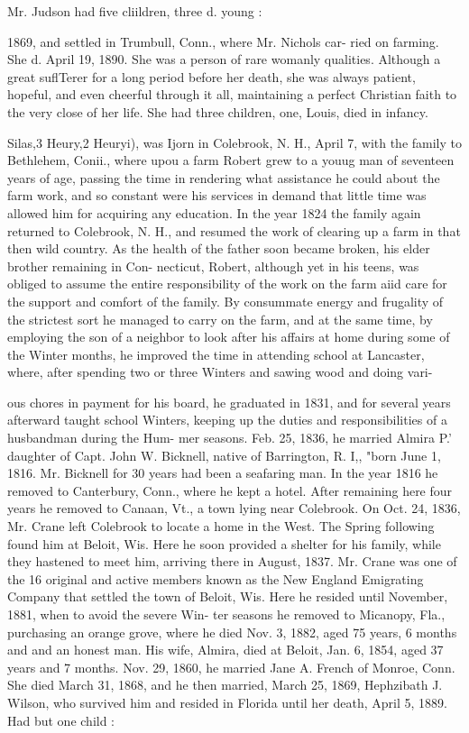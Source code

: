 \documentclass[oneside]{book}
\begin{document}
Mr. Judson had five cliildren, three d. young : 




1869, and settled in Trumbull, Conn., where Mr. Nichols car- 
ried on farming. She d. April 19, 1890. She was a person of 
rare womanly qualities. Although a great suflTerer for a long 
period before her death, she was always patient, hopeful, and 
even cheerful through it all, maintaining a perfect Christian 
faith to the very close of her life. She had three children, 
one, Louis, died in infancy. 



Silas,3 Heury,2 Heuryi), was Ijorn in Colebrook, N. H., April 7, 
with the family to Bethlehem, Conii., where upou a farm Robert 
grew to a youug man of seventeen years of age, passing the time 
in rendering what assistance he could about the farm work, and 
so constant were his services in demand that little time was allowed 
him for acquiring any education. In the year 1824 the family 
again returned to Colebrook, N. H., and resumed the work of 
clearing up a farm in that then wild country. As the health of the 
father soon became broken, his elder brother remaining in Con- 
necticut, Robert, although yet in his teens, was obliged to assume 
the entire responsibility of the work on the farm aiid care for the 
support and comfort of the family. By consummate energy and 
frugality of the strictest sort he managed to carry on the farm, 
and at the same time, by employing the son of a neighbor to look 
after his affairs at home during some of the Winter months, he 
improved the time in attending school at Lancaster, where, after 
spending two or three Winters and sawing wood and doing vari- 




ous chores in payment for his board, he graduated in 1831, and 
for several years afterward taught school Winters, keeping up 
the duties and responsibilities of a husbandman during the Hum- 
mer seasons. Feb. 25, 1836, he married Almira P.' daughter 
of Capt. John W. Bicknell, native of Barrington, R. I,, "born 
June 1, 1816. Mr. Bicknell for 30 years had been a seafaring 
man. In the year 1816 he removed to Canterbury, Conn., 
where he kept a hotel. After remaining here four years he 
removed to Canaan, Vt., a town lying near Colebrook. On 
Oct. 24, 1836, Mr. Crane left Colebrook to locate a home in the 
West. The Spring following found him at Beloit, Wis. Here 
he soon provided a shelter for his family, while they hastened to 
meet him, arriving there in August, 1837. Mr. Crane was one 
of the 16 original and active members known as the New England 
Emigrating Company that settled the town of Beloit, Wis. Here 
he resided until November, 1881, when to avoid the severe Win- 
ter seasons he removed to Micanopy, Fla., purchasing an orange 
grove, where he died Nov. 3, 1882, aged 75 years, 6 months and 
and an honest man. His wife, Almira, died at Beloit, Jan. 6, 
1854, aged 37 years and 7 months. Nov. 29, 1860, he married 
Jane A. French of Monroe, Conn. She died March 31, 1868, 
and he then married, March 25, 1869, Hephzibath J. Wilson, 
who survived him and resided in Florida until her death, April 
5, 1889. Had but one child : 
\end{document}
